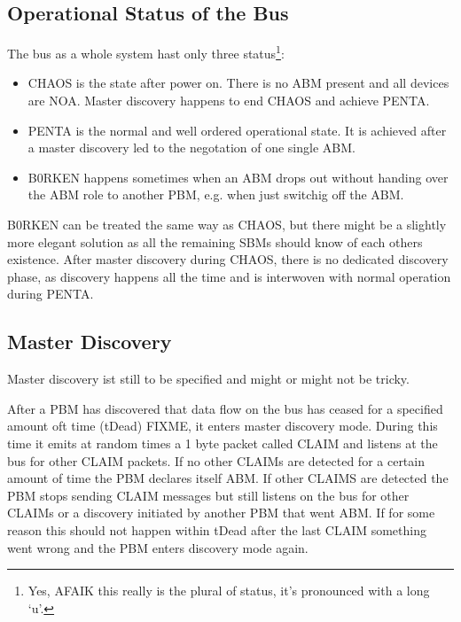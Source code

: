 \documentclass[a4paper,12pt]{scrartcl}
\begin{document}
\subsection{Operational Status of the Bus}
The bus as a whole system hast only three status\footnote{Yes, AFAIK this really is the plural of status, it's pronounced with a long `u'.}:
\begin{itemize}
 \item CHAOS is the state after power on. There is no ABM present and all devices are NOA. Master discovery happens to end CHAOS and achieve PENTA.
 \item PENTA is the normal and well ordered operational state. It is achieved after a master discovery led to the negotation of one single ABM.
 \item B0RKEN happens sometimes when an ABM drops out without handing over the ABM role to another PBM, e.g. when just switchig off the ABM.
\end{itemize}
B0RKEN can be treated the same way as CHAOS, but there might be a slightly more elegant solution as all the remaining SBMs should know of each others existence.
After master discovery during CHAOS, there is no dedicated discovery phase, as discovery happens all the time and is interwoven with normal operation during PENTA.

\subsection{Master Discovery}
Master discovery ist still to be specified and might or might not be tricky.


After a PBM has discovered that data flow on the bus has ceased for a specified amount oft time (tDead) FIXME,
it enters master discovery mode.
During this time it emits at random times a 1 byte packet called CLAIM and listens at the bus for other CLAIM packets.
If no other CLAIMs are detected for a certain amount of time the PBM declares itself ABM.
If other CLAIMS are detected the PBM stops sending CLAIM messages but still listens on the bus for other CLAIMs or a discovery initiated by another PBM that went ABM.
If for some reason this should not happen within tDead after the last CLAIM something went wrong and the PBM enters discovery mode again.
\end{document}
